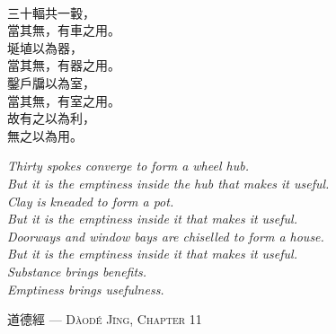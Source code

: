 \pagecolor{bg}
\thispagestyle{empty}
\text{}
\vfill
\noindent
\begin{minipage}[t]{0.35\textwidth}
	\begin{flushright}
		\textcolor{goban}{\large
			\\
			三十輻共一轂，\\
			當其無，有車之用。\\
			\vspace{0.5em}
			埏埴以為器，\\
			當其無，有器之用。\\
			\vspace{0.5em}
			鑿戶牖以為室，\\
			當其無，有室之用。\\
			\vspace{0.5em}
			故有之以為利，\\
			無之以為用。}
	\end{flushright}
\end{minipage}%
\hfill
{\color{goban}\vrule}
\hfill
\begin{minipage}[t]{0.55\textwidth}
	\vspace{1pt}
	\raggedright
	\textcolor{goban}{\emph{
			Thirty spokes converge to form a wheel hub.\\
			But it is the emptiness inside the hub that makes it useful.\\
			\vspace{0.8em}
			Clay is kneaded to form a pot.\\
			But it is the emptiness inside it that makes it useful.\\
			\vspace{0.8em}
			Doorways and window bays are chiselled to form a house.\\
			But it is the emptiness inside it that makes it useful.\\
			\vspace{0.8em}
			Substance brings benefits.\\
			Emptiness brings usefulness.}
	}
\end{minipage}

\vspace{1em}
\hfill {\textcolor{goban}{道德經 — \textsc{Dàodé Jīng, Chapter 11}}}


